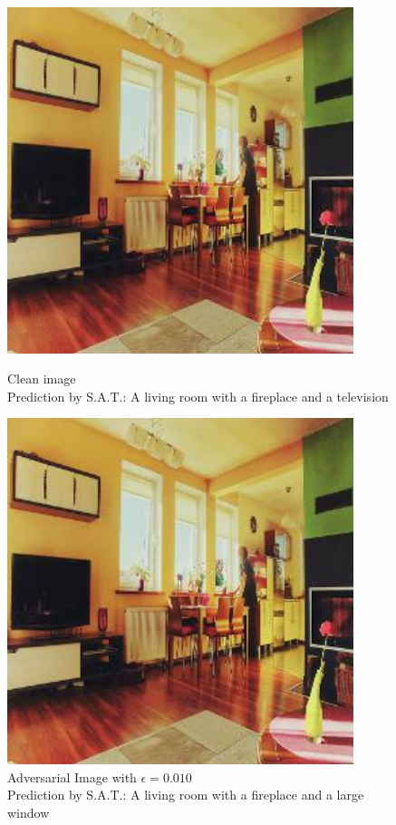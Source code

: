 \begin{figure}[ht]
    \centering
    \begin{minipage}{0.45\textwidth}
        \centering
        \includegraphics[width=0.9\textwidth]{../code/ShowDistractAndDeceive/samples/0.000/img_0.jpg} %
        \caption*{Clean image\\Prediction by S.A.T.: A living room with a fireplace and a television}
    \end{minipage}\hfill
    \begin{minipage}{0.45\textwidth}
        \centering
        \includegraphics[width=0.9\textwidth]{../code/ShowDistractAndDeceive/samples/0.010/img_0.jpg} %
        \caption*{Adversarial Image with $\epsilon=0.010$\\Prediction by S.A.T.: A living room with a fireplace and a large window}
    \end{minipage}
\end{figure}

